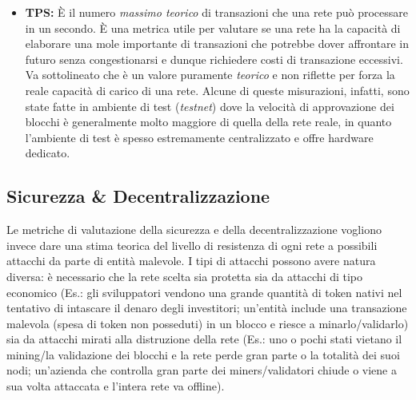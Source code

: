 \documentclass[a4paper, 12pt]{article}
\begin{document}
\begin{itemize}
\item \textbf{TPS: }
È il numero \textit{massimo teorico} di transazioni che una rete può processare in un secondo.
È una metrica utile per valutare se una rete ha la capacità di elaborare una mole importante di transazioni che potrebbe dover affrontare in futuro senza
congestionarsi e dunque richiedere costi di transazione eccessivi.
Va sottolineato che è un valore puramente \textit{teorico} e non riflette per forza la reale capacità di carico di una rete.
Alcune di queste misurazioni, infatti, sono state fatte in ambiente di test (\textit{testnet}) dove la velocità di approvazione dei blocchi è
generalmente molto maggiore di quella della rete reale, in quanto l'ambiente di test è spesso estremamente centralizzato e offre hardware dedicato.

\end{itemize}

\newpage

\subsection*{Sicurezza \& Decentralizzazione}
Le metriche di valutazione della sicurezza e della decentralizzazione vogliono invece dare una stima teorica del livello di resistenza di ogni rete a possibili attacchi da parte di entità
malevole. I tipi di attacchi possono avere natura diversa: è necessario che la rete scelta sia protetta sia da attacchi di tipo economico (Es.: gli sviluppatori vendono una grande quantità
di token nativi nel tentativo di intascare il denaro degli investitori; un'entità include una transazione malevola (spesa
di token non posseduti) in un blocco e riesce a minarlo/validarlo) sia da attacchi mirati alla distruzione della rete (Es.: uno o pochi stati vietano il mining/la validazione dei blocchi
e la rete perde gran parte o la totalità dei suoi nodi; un'azienda che controlla gran parte dei miners/validatori chiude o viene a sua volta attaccata e l'intera rete va offline).
\end{document}
